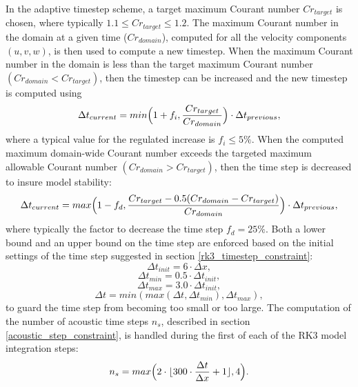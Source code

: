 In the adaptive timestep scheme, a target maximum Courant number
$Cr_{target}$ is chosen, where typically $1.1 \leq Cr_{target} \leq
1.2$.  The maximum Courant number in the domain at a given time ($Cr_{domain}$), computed
for all the velocity components $(u,v,w)$, is then used to compute a new
timestep.  When the maximum Courant number in the domain is less than
the target maximum Courant number $(Cr_{domain} < Cr_{target})$, 
then the timestep can be increased
and the new timestep is computed using
%
\begin{equation}
\Delta t_{current} = min \Big( 1+f_{i} , 
{Cr_{target} \over Cr_{domain}}\Big) \cdot \Delta t_{previous},
\label{adapt_inc_timestep}
\end{equation}
%
\noindent
where a typical value for the regulated increase is $f_{i} \leq 5\%$.  When
the computed maximum domain-wide Courant number exceeds the targeted
maximum allowable Courant number $(Cr_{domain} > Cr_{target})$, 
then the time step is 
decreased to insure model stability:
%
\begin{equation}
\Delta t_{current} = max \Big( 1-f_{d} , 
{{Cr_{target} - {0.5 ({Cr_{domain} - Cr_{target}}) }} 
\over Cr_{domain} } \Big) \cdot \Delta t_{previous},
\label{adapt_dec_timestep}
\end{equation}
%
\noindent
where typically the factor to decrease the time step $f_{d} = 25\%$.  Both a lower bound and
an upper bound on the time step are enforced based on the initial settings 
of the time step suggested in section \ref{rk3_timestep_constraint}:
%
\begin{equation}
\Delta t_{init}  = 6 \cdot \Delta x ,
\label{adapt_init_timestep}
\end{equation}
\begin{equation}
\Delta t_{min} = 0.5 \cdot \Delta t_{init},
\label{adapt_bound_min_timestep}
\end{equation}
\begin{equation}
\Delta t_{max} = 3.0 \cdot \Delta t_{init},
\label{adapt_bound_max_timestep}
\end{equation}
\begin{equation}
\Delta t = min ( max ( \Delta t, \Delta t_{min} ) , \Delta t_{max} ),
\label{adapt_bound_min_timestep}
\end{equation}
%
\noindent
to guard the time step from becoming too small or too large.  
The computation of the number of acoustic time steps $n_s$, described in section
\ref{acoustic_step_constraint}, is handled during the first of each of the
RK3 model integration steps:
%
\begin{equation}
n_s
= max \Big( 2 \cdot \lfloor { 300 \cdot {\Delta t \over \Delta x} + 1 } \rfloor , 4 \Big).
\label{adapt_acoustic_timestep}
\end{equation}
%


